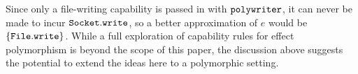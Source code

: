 Since only a file-writing capability is passed in with $\mathtt{polywriter}$, it can never be made to incur $\mathtt{Socket.write}$, so a better approximation of $e$ would be $\{ \mathtt{File.write} \}$.
While a full exploration of capability rules for effect polymorphism is beyond the scope of this paper, the discussion above suggests the potential to extend the ideas here to a polymorphic setting.

%
%
%
%
%

